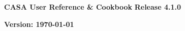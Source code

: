 \pagestyle{empty}

\begin{center}
\Huge
{\bf CASA User Reference \& Cookbook} 
\break 
\break 
\huge
{\bf Release 4.1.0}
\break 
\end{center}
\normalsize
\vspace{2.5cm}
\begin{figure}[h!]
\begin{center}
\end{center}
\end{figure}


\Large
\vfill
\begin{center}
{\bf Version: \today}
\end{center}
\normalsize

\pagebreak
